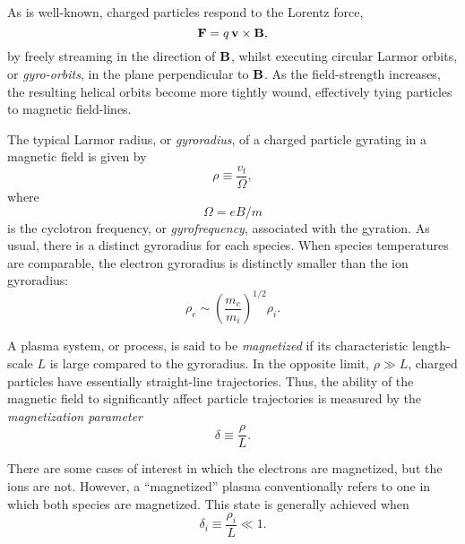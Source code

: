 As is well-known, charged particles respond to the Lorentz force,
\begin{equation}
{\bf F} = q\,{\bf v}\times {\bf B},
\end{equation}
by freely streaming in the direction of ${\bf B}$, whilst executing
circular Larmor orbits, or {\em gyro-orbits}, in the plane perpendicular to ${\bf B}$. 
As the field-strength increases, the resulting helical orbits become more
tightly wound, effectively tying particles to magnetic field-lines. 

The typical Larmor radius, or {\em gyroradius}, of a charged particle 
gyrating in a
magnetic field is given by
\begin{equation}
\rho\equiv \frac{v_t}{\Omega},
\end{equation}
where
\begin{equation}
{\Omega} = e B/m
\end{equation}
is the cyclotron frequency, or {\em gyrofrequency}, associated with the
gyration. As usual, there is a distinct gyroradius for each species.
When species temperatures are comparable, the electron gyroradius is
distinctly smaller than the ion gyroradius:
\begin{equation}
\rho_e \sim \left(\frac{m_e}{m_i}\right)^{1/2}\!\rho_i.
\end{equation}

A plasma system, or process, is said to be {\em magnetized}\/ if its
characteristic length-scale $L$ is large compared to the gyroradius.
In the opposite limit, $\rho\gg L$, charged particles  have essentially
straight-line trajectories. Thus, the ability of the magnetic field to
significantly affect particle trajectories is measured by the
{\em magnetization parameter}
\begin{equation}
\delta \equiv \frac{\rho}{L}.
\end{equation}

There are some cases of interest in which the electrons are magnetized, but the
ions are not. However, a ``magnetized'' plasma conventionally refers to
one in which both species are magnetized. This state is generally achieved
when
\begin{equation}
\delta_i \equiv \frac{\rho_i}{L} \ll 1.
\end{equation}

